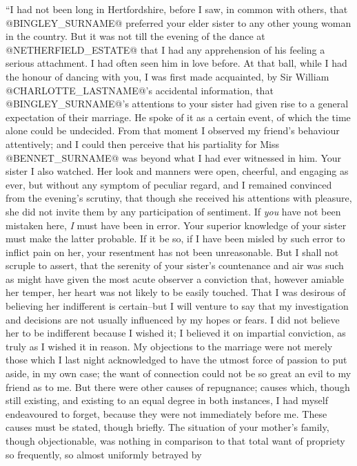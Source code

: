 ``I had not been long in Hertfordshire, before I saw, in common with
others, that @BINGLEY_SURNAME@ preferred your elder sister to any other young
woman in the country. But it was not till the evening of the dance
at @NETHERFIELD_ESTATE@ that I had any apprehension of his feeling a serious
attachment. I had often seen him in love before. At that ball, while I
had the honour of dancing with you, I was first made acquainted, by Sir
William @CHARLOTTE_LASTNAME@'s accidental information, that @BINGLEY_SURNAME@'s attentions to
your sister had given rise to a general expectation of their marriage.
He spoke of it as a certain event, of which the time alone could
be undecided. From that moment I observed my friend's behaviour
attentively; and I could then perceive that his partiality for Miss
@BENNET_SURNAME@ was beyond what I had ever witnessed in him. Your sister I also
watched. Her look and manners were open, cheerful, and engaging as ever,
but without any symptom of peculiar regard, and I remained convinced
from the evening's scrutiny, that though she received his attentions
with pleasure, she did not invite them by any participation of
sentiment. If \textit{you} have not been mistaken here, \textit{I} must have been
in error. Your superior knowledge of your sister must make the latter
probable. If it be so, if I have been misled by such error to inflict
pain on her, your resentment has not been unreasonable. But I shall not
scruple to assert, that the serenity of your sister's countenance and
air was such as might have given the most acute observer a conviction
that, however amiable her temper, her heart was not likely to be
easily touched. That I was desirous of believing her indifferent is
certain--but I will venture to say that my investigation and decisions
are not usually influenced by my hopes or fears. I did not believe
her to be indifferent because I wished it; I believed it on impartial
conviction, as truly as I wished it in reason. My objections to the
marriage were not merely those which I last night acknowledged to have
the utmost force of passion to put aside, in my own case; the want of
connection could not be so great an evil to my friend as to me. But
there were other causes of repugnance; causes which, though still
existing, and existing to an equal degree in both instances, I had
myself endeavoured to forget, because they were not immediately before
me. These causes must be stated, though briefly. The situation of your
mother's family, though objectionable, was nothing in comparison to that
total want of propriety so frequently, so almost uniformly betrayed by
